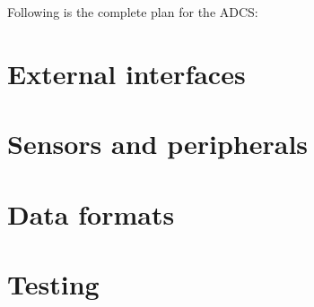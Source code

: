 \documentclass[11pt,a4paper]{report}
\begin{document}
Following is the complete plan for the ADCS: 



\chapter{External interfaces} \thispagestyle{fancy}

\chapter{Sensors and peripherals} \thispagestyle{fancy}

\chapter{Data formats}\thispagestyle{fancy}

\chapter{Testing}\thispagestyle{fancy} 
\end{document}
